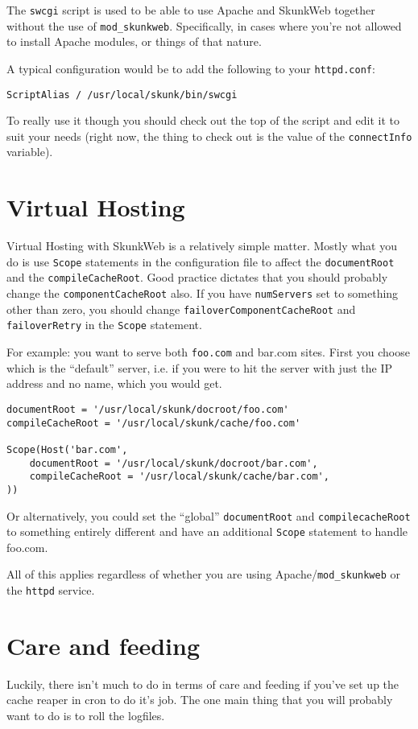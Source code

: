 \documentclass[titlepage]{manual}
\begin{document}
The \texttt{swcgi} script is used to be able to use Apache and
SkunkWeb together without the use of \texttt{mod_skunkweb}.
Specifically, in cases where you're not allowed to install Apache
modules, or things of that nature.

A typical configuration would be to add the following to your
\texttt{httpd.conf}:
\begin{verbatim}
ScriptAlias / /usr/local/skunk/bin/swcgi
\end{verbatim}

To really use it though you should check out the top of the script and
edit it to suit your needs (right now, the thing to check out is the
value of the \texttt{connectInfo} variable).

\chapter{Virtual Hosting}
Virtual Hosting with SkunkWeb is a relatively simple matter.  Mostly
what you do is use \texttt{Scope} statements in the configuration file
to affect the \texttt{documentRoot} and the \texttt{compileCacheRoot}.
Good practice dictates that you should probably change the
\texttt{componentCacheRoot} also.  If you have \texttt{numServers} set
to something other than zero, you should change
\texttt{failoverComponentCacheRoot} and \texttt{failoverRetry} in the
\texttt{Scope} statement.

For example:  you want to serve both \texttt{foo.com} and {bar.com} sites.
First you choose which is the ``default'' server, i.e. if you were to hit
the server with just the IP address and no name, which you would get.

\begin{verbatim}
documentRoot = '/usr/local/skunk/docroot/foo.com'
compileCacheRoot = '/usr/local/skunk/cache/foo.com'

Scope(Host('bar.com',
    documentRoot = '/usr/local/skunk/docroot/bar.com',
    compileCacheRoot = '/usr/local/skunk/cache/bar.com',
))    
\end{verbatim}

Or alternatively, you could set the ``global'' \texttt{documentRoot}
and \texttt{compilecacheRoot} to something entirely different and have
an additional \texttt{Scope} statement to handle foo.com.

All of this applies regardless of whether you are using
Apache/\texttt{mod\_skunkweb} or the \texttt{httpd} service.

\chapter{Care and feeding}
Luckily, there isn't much to do in terms of care and feeding if you've
set up the cache reaper in cron to do it's job.  The one main thing
that you will probably want to do is to roll the logfiles.
\end{document}

